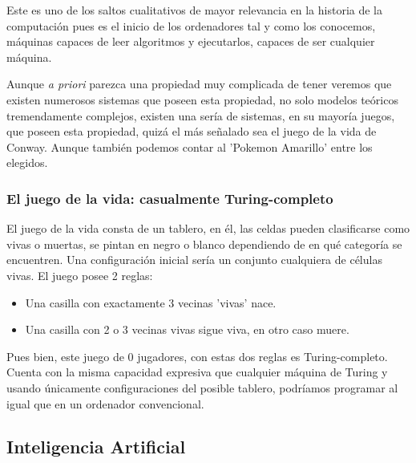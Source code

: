 Este es uno de los saltos cualitativos de mayor relevancia en la historia de la computación pues es el inicio de los ordenadores tal y como los conocemos, máquinas capaces de leer algoritmos y ejecutarlos, capaces de ser cualquier máquina.

\vspace{10px}

Aunque \textit{a priori} parezca una propiedad muy complicada de tener veremos que existen numerosos sistemas que poseen esta propiedad, no solo modelos teóricos tremendamente complejos, existen una sería de sistemas, en su mayoría juegos, que poseen esta propiedad, quizá el más señalado sea el juego de la vida de Conway. Aunque también podemos contar al 'Pokemon Amarillo' entre los elegidos.




\subsubsection{El juego de la vida: casualmente Turing-completo}

El juego de la vida consta de un tablero, en él, las celdas pueden clasificarse como vivas o muertas, se pintan en negro o blanco dependiendo de en qué categoría se encuentren. Una configuración inicial sería un conjunto cualquiera de células vivas. El juego posee 2 reglas:

\begin{multicols}{2}
	\begin{itemize}
		\item Una casilla con exactamente 3 vecinas 'vivas' nace.
		\item Una casilla con 2 o 3 vecinas vivas sigue viva, en otro caso muere.
	\end{itemize}
\end{multicols}


Pues bien, este juego de 0 jugadores, con estas dos reglas es Turing-completo. Cuenta con la misma capacidad expresiva que cualquier máquina de Turing y usando únicamente configuraciones del posible tablero, podríamos programar al igual que en un ordenador convencional.

\subsection{Inteligencia Artificial}

